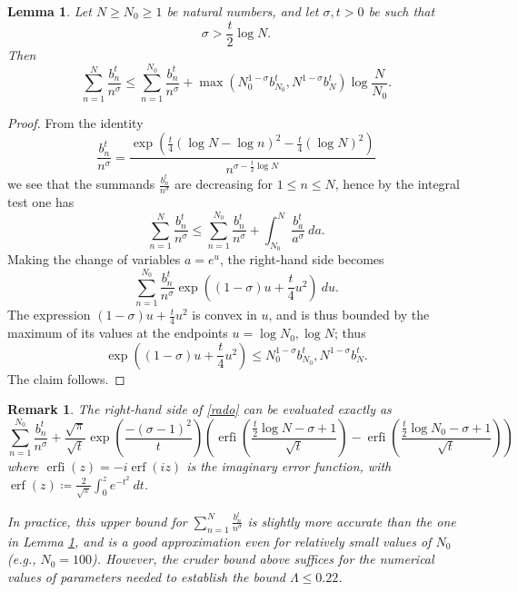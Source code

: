 \documentclass[a4paper,11pt,twoside]{amsart}
\newtheorem{lemma}[theorem]{Lemma}
\newtheorem{remark}[theorem]{Remark}
\begin{document}
\begin{lemma}\label{largen}
Let $N \geq N_0 \geq 1$ be natural numbers, and let $\sigma,t > 0$ be such that
$$ \sigma > \frac{t}{2} \log N.$$
Then
$$ \sum_{n=1}^N \frac{b_n^t}{n^\sigma} \leq \sum_{n=1}^{N_0}
\frac{b_n^t}{n^\sigma}  + 
\max( N_0^{1-\sigma} b_{N_0}^t, N^{1-\sigma} b_N^t ) \log \frac{N}{N_0}.$$
\end{lemma}

\begin{proof}  From the identity
$$ \frac{b_n^t}{n^\sigma} = \frac{\exp\left( \frac{t}{4} (\log N - \log n)^2 - \frac{t}{4} (\log N)^2\right) }{n^{\sigma - \frac{t}{2} \log N}}$$
we see that the summands $\frac{b_n^t}{n^\sigma}$ are decreasing for $1 \leq n \leq N$, hence by the integral test one has
\begin{equation}\label{rado}
 \sum_{n=1}^N \frac{b_n^t}{n^\sigma} \leq \sum_{n=1}^{N_0}
\frac{b_n^t}{n^\sigma}  + \int_{N_0}^N \frac{b_a^t}{a^\sigma}\ da.
\end{equation}
Making the change of variables $a = e^u$, the right-hand side becomes
$$\sum_{n=1}^{N_0} \frac{b_n^t}{n^\sigma} \exp( (1-\sigma) u + \frac{t}{4} u^2 )\ du.$$
The expression $(1-\sigma) u + \frac{t}{4} u^2$ is convex in $u$, and is thus bounded by the maximum of its values at the endpoints $u = \log N_0, \log N$; thus
$$\exp( (1-\sigma) u + \frac{t}{4} u^2) \leq N_0^{1-\sigma} b_{N_0}^t, N^{1-\sigma} b_N^t.$$
The claim follows. 
\end{proof}

\begin{remark}  The right-hand side of \eqref{rado} can be evaluated exactly as
$$
\sum_{n=1}^{N_0}
\frac{b_n^t}{n^\sigma}  + \frac{\sqrt \pi}{\sqrt t} \exp(\frac{-(\sigma - 1)^2}{t}) \left( \operatorname{erfi}\left(\frac{\frac{t}{2} \log N  - \sigma + 1}{\sqrt t} \right) - \operatorname{erfi}\left(\frac{\frac{t}{2} \log N_0  - \sigma + 1}{\sqrt t}\right) \right)$$
where $\operatorname{erfi}(z) = -i \operatorname{erf}(iz)$ is the imaginary error function, with $\operatorname{erf}(z) \coloneqq \frac{2}{\sqrt{\pi}} \int_0^z e^{-t^2}\ dt$.

In practice, this upper bound for $\sum_{n=1}^N \frac{b_n^t}{n^\sigma}$ is slightly more accurate than the one in Lemma \ref{largen}, and is a good approximation even for relatively small values of $N_0$ (e.g., $N_0=100$).  However, the cruder bound above suffices for the numerical values of parameters needed to establish the bound $\Lambda \leq 0.22$.
\end{remark}
\end{document}
